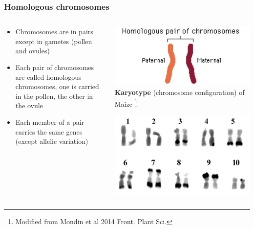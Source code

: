 \documentclass{beamer}
\newcommand\blfootnote[1]{%
	\begingroup
	\renewcommand\thefootnote{}\footnote{#1}%
	\addtocounter{footnote}{-1}%
	\endgroup
}
\begin{document}
\begin{frame}
	\frametitle{Homologous chromosomes}

\begin{columns}

	\begin{column}{0.5\textwidth}
\begin{itemize}
	\item[] Chromosomes are in pairs except in gametes (pollen and ovules)

	\item Each pair of chromosomes are called homologous chromosomes, one is carried in the pollen, the other in the ovule
	\item Each member of a pair carries the same genes (except allelic variation)
\end{itemize}
\end{column}
	\begin{column}{0.5\textwidth}
	\includegraphics[keepaspectratio, width  =\textwidth]{img/homologousChroms}
	\vspace{10pt}\\
	
		\tiny	\textbf{Karyotype} (chromosome configuration) of Maize	\blfootnote{Modified from Mondin et al 2014 Front. Plant Sci.}
	\includegraphics[keepaspectratio, width  =\textwidth]{img/maizeKaryotype}


\end{column}
\end{columns}

\end{frame}
\end{document}
